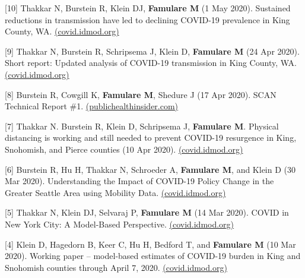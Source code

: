 \documentclass{article}
\begin{document}
\begin{llist}
\begin{items}
	\item[{[10]}] Thakkar N, Burstein R, Klein DJ, \textbf{Famulare M} (1 May 2020). Sustained reductions in transmission have led to declining COVID-19 prevalence in King County, WA. \href{https://iazpvnewgrp01.blob.core.windows.net/source/2021-02/reports/pdf/Sustained_reductions_in_transmission_have_led_to_declining_COVID_19_prevalence_in_King_County_WA.pdf}{(covid.idmod.org)}
	
	\item[{[9]}] Thakkar N, Burstein R, Schripsema J, Klein D, \textbf{Famulare M} (24 Apr 2020). Short report: Updated analysis of COVID-19 transmission in 
	King County, WA. \href{https://iazpvnewgrp01.blob.core.windows.net/source/2021-02/reports/pdf/Updated.analysis.of_.COVID-19.transmission.in_.King_.County.pdf}{(covid.idmod.org)}
	
	\item[{[8]}] Burstein R, Cowgill K, \textbf{Famulare M}, Shedure J (17 Apr 2020). SCAN Technical Report \#1. \href{https://publichealthinsider.com/wp-content/uploads/2020/04/SCAN-Technical-Report-1-v2-23-APR-2020.pdf}{(publichealthinsider.com)}
	
	\item[{[7]}] Thakkar N. Burstein R, Klein D, Schripsema J, \textbf{Famulare M}. Physical distancing is working and still needed to prevent COVID-19 resurgence in King, Snohomish, and Pierce counties (10 Apr 2020). \href{https://iazpvnewgrp01.blob.core.windows.net/source/2021-02/reports/pdf/Physical_distancing_working_and_still_needed_to_prevent_COVID-19_resurgence.pdf}{(covid.idmod.org)}
	
	\item[{[6]}]
	Burstein R, Hu H, Thakkar N, Schroeder A, \textbf{Famulare M}, and Klein D (30 Mar 2020).	Understanding the Impact of COVID-19 Policy Change in the Greater Seattle Area using Mobility Data. \href{https://iazpvnewgrp01.blob.core.windows.net/source/2021-02/reports/pdf/Understanding_impact_of_COVID_policy_change_Seattle_0.pdf}{(covid.idmod.org)}
	
	\item[{[5]}] Thakkar N, Klein DJ, Selvaraj P, \textbf{Famulare M} (14 Mar 2020). COVID in New York City: A Model-Based Perspective. \href{https://iazpvnewgrp01.blob.core.windows.net/source/2021-02/reports/pdf/COVID_Modeling_NYC.pdf}{(covid.idmod.org)}
		
	\item[{[4]}]
	Klein D, Hagedorn B, Keer C, Hu H, Bedford T, and \textbf{Famulare M} (10 Mar 2020). Working paper – model-based estimates of COVID-19 burden in King and Snohomish counties through April 7, 2020. \href{https://institutefordiseasemodeling.github.io/COVID-public/reports/Working%20paper%20%E2%80%93%20model-based%20estimates%20of%20COVID-19%20burden%20in%20King%20and%20Snohomish%20counties%20through%20April%207.pdf}{(covid.idmod.org)}
	

\end{items}
\end{llist}
\end{document}
